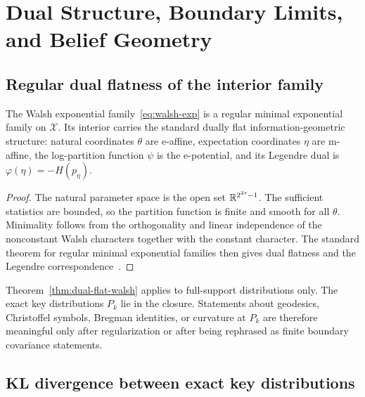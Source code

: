 \section{Dual Structure, Boundary Limits, and Belief Geometry}\label{sec:dual}

\subsection{Regular dual flatness of the interior family}\label{subsec:dual-flat}

\begin{theorem}\label{thm:dual-flat-walsh}
The Walsh exponential family~\eqref{eq:walsh-exp} is a regular minimal
exponential family on $\mathcal X$.  Its interior carries the standard dually
flat information-geometric structure: natural coordinates $\theta$ are
e-affine, expectation coordinates $\eta$ are m-affine, the log-partition
function $\psi$ is the e-potential, and its Legendre dual is
$\varphi(\eta)=-H(p_\eta)$.
\end{theorem}

\begin{proof}
The natural parameter space is the open set $\mathbb{R}^{2^{2s}-1}$.  The sufficient
statistics are bounded, so the partition function is finite and smooth for all
$\theta$.  Minimality follows from the orthogonality and linear independence of
the nonconstant Walsh characters together with the constant character.  The
standard theorem for regular minimal exponential families then gives dual
flatness and the Legendre correspondence~\cite{amari2000methods,ay2017information}.
\end{proof}

\begin{remark}
Theorem~\ref{thm:dual-flat-walsh} applies to full-support distributions only.
The exact key distributions $P_k$ lie in the closure.  Statements about
geodesics, Christoffel symbols, Bregman identities, or curvature at $P_k$ are
therefore meaningful only after regularization or after being rephrased as
finite boundary covariance statements.
\end{remark}

\subsection{KL divergence between exact key distributions}\label{subsec:kl-keys}

